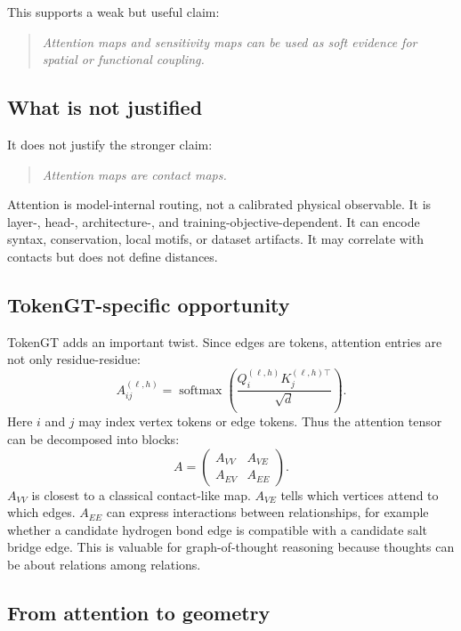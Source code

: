 \documentclass[11pt]{article}
\begin{document}
This supports a weak but useful claim:
\begin{quote}
\emph{Attention maps and sensitivity maps can be used as soft evidence for spatial or functional coupling.}
\end{quote}

\subsection{What is not justified}

It does not justify the stronger claim:
\begin{quote}
\emph{Attention maps are contact maps.}
\end{quote}

Attention is model-internal routing, not a calibrated physical observable. It is layer-, head-, architecture-, and training-objective-dependent. It can encode syntax, conservation, local motifs, or dataset artifacts. It may correlate with contacts but does not define distances.

\subsection{TokenGT-specific opportunity}

TokenGT adds an important twist. Since edges are tokens, attention entries are not only residue-residue:
\[
A_{ij}^{(\ell,h)} =
\operatorname{softmax}\left(
\frac{Q_i^{(\ell,h)}K_j^{(\ell,h)\top}}{\sqrt{d}}
\right).
\]
Here $i$ and $j$ may index vertex tokens or edge tokens. Thus the attention tensor can be decomposed into blocks:
\[
A=
\begin{pmatrix}
A_{VV} & A_{VE}\\
A_{EV} & A_{EE}
\end{pmatrix}.
\]
$A_{VV}$ is closest to a classical contact-like map. $A_{VE}$ tells which vertices attend to which edges. $A_{EE}$ can express interactions between relationships, for example whether a candidate hydrogen bond edge is compatible with a candidate salt bridge edge. This is valuable for graph-of-thought reasoning because thoughts can be about relations among relations.

\subsection{From attention to geometry}
\end{document}
